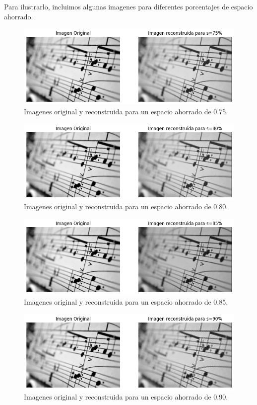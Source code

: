 \documentclass[a4paper,12pt]{article}
\begin{document}
Para ilustrarlo, incluimos algunas imagenes para diferentes porcentajes de espacio ahorrado. 
\begin{figure}[H]
    \centering
    \includegraphics[width=1\textwidth]{Ejercicio 4b75.png}
    \caption{Imagenes original y reconstruida para un espacio ahorrado de 0.75.}
    \label{fig:ej4b1}
\end{figure}
\begin{figure}[H]
    \centering
    \includegraphics[width=1\textwidth]{Ejercicio 4b80.png}
    \caption{Imagenes original y reconstruida para un espacio ahorrado de 0.80.}
    \label{fig:ej4b2}
\end{figure}
\begin{figure}[H]
    \centering
    \includegraphics[width=1\textwidth]{Ejercicio 4b85.png}
    \caption{Imagenes original y reconstruida para un espacio ahorrado de 0.85.}
    \label{fig:ej4b3}
\end{figure}
\begin{figure}[H]
    \centering
    \includegraphics[width=1\textwidth]{Ejercicio 4b90.png}
    \caption{Imagenes original y reconstruida para un espacio ahorrado de 0.90.}
    \label{fig:ej4b4}
\end{figure}
\end{document}
